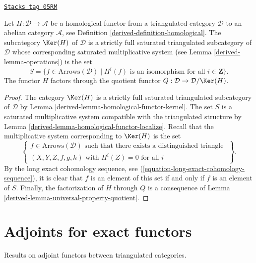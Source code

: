 \begin{lemma}
\label{derived-lemma-acyclic-general}
\href{https://stacks.math.columbia.edu/tag/05RM}{\texttt{Stacks tag 05RM}}

Let $H : \mathcal{D} \to \mathcal{A}$ be a homological functor from a
triangulated category $\mathcal{D}$ to an abelian category $\mathcal{A}$, see
Definition \ref{derived-definition-homological}.
The subcategory $\Ker(H)$ of $\mathcal{D}$ is a strictly full
saturated triangulated subcategory of $\mathcal{D}$ whose corresponding
saturated multiplicative system (see
Lemma \ref{derived-lemma-operations})
is the set
$$
S = \{f \in \text{Arrows}(\mathcal{D}) \mid
H^i(f)\text{ is an isomorphism for all }i \in \mathbf{Z}\}.
$$
The functor $H$ factors through the quotient functor
$Q : \mathcal{D} \to \mathcal{D}/\Ker(H)$.
\end{lemma}

\begin{proof}

The category $\Ker(H)$ is a strictly full saturated triangulated
subcategory of $\mathcal{D}$ by
Lemma \ref{derived-lemma-homological-functor-kernel}.
The set $S$ is a saturated multiplicative system compatible with the
triangulated structure by
Lemma \ref{derived-lemma-homological-functor-localize}.
Recall that the multiplicative system corresponding to
$\Ker(H)$ is the set
$$
\left\{
\begin{matrix}
f \in \text{Arrows}(\mathcal{D})
\text{ such that there exists a distinguished triangle }\\
(X, Y, Z, f, g, h)\text{ with } H^i(Z) = 0 \text{ for all }i
\end{matrix}
\right\}.
$$
By the long exact cohomology sequence, see
(\ref{equation-long-exact-cohomology-sequence}),
it is clear that $f$ is an element of this set if and only if $f$ is
an element of $S$. Finally, the factorization of $H$ through $Q$ is a
consequence of
Lemma \ref{derived-lemma-universal-property-quotient}.
\end{proof}

\section{Adjoints for exact functors}
\label{derived-section-adjoints}
Results on adjoint functors between triangulated categories.

